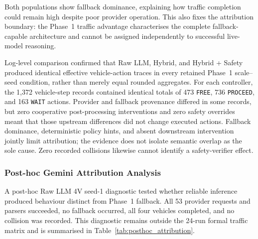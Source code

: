 \documentclass[letterpaper,10pt,conference]{ieeeconf}
\begin{document}
Both populations show fallback dominance, explaining how traffic completion could remain high despite poor provider operation. This also fixes the attribution boundary: the Phase~1 traffic advantage characterises the complete fallback-capable architecture and cannot be assigned independently to successful live-model reasoning.



Log-level comparison confirmed that Raw LLM, Hybrid, and Hybrid + Safety produced identical effective vehicle-action traces in every retained Phase~1 scale--seed condition, rather than merely equal rounded aggregates. For each controller, the 1,372 vehicle-step records contained identical totals of 473 \texttt{FREE}, 736 \texttt{PROCEED}, and 163 \texttt{WAIT} actions. Provider and fallback provenance differed in some records, but zero cooperative post-processing interventions and zero safety overrides meant that those upstream differences did not change executed actions. Fallback dominance, deterministic policy hints, and absent downstream intervention jointly limit attribution; the evidence does not isolate semantic overlap as the sole cause. Zero recorded collisions likewise cannot identify a safety-verifier effect.



\subsubsection{Post-hoc Gemini Attribution Analysis}



A post-hoc Raw LLM 4V seed-1 diagnostic tested whether reliable inference produced behaviour distinct from Phase~1 fallback. All 53 provider requests and parsers succeeded, no fallback occurred, all four vehicles completed, and no collision was recorded. This diagnostic remains outside the 24-run formal traffic matrix and is summarised in Table~\ref{tab:posthoc_attribution}.
\end{document}
